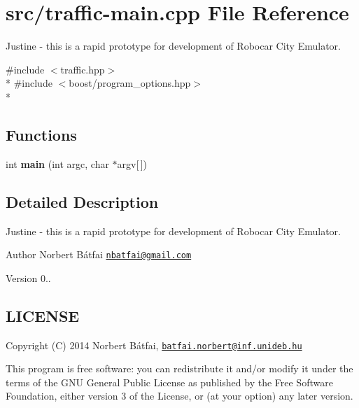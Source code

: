 \hypertarget{traffic-main_8cpp}{\section{src/traffic-\/main.cpp File Reference}
\label{traffic-main_8cpp}
}


Justine -\/ this is a rapid prototype for development of Robocar City Emulator.  


{\ttfamily \#include $<$traffic.\-hpp$>$}\\*
{\ttfamily \#include $<$boost/program\-\_\-options.\-hpp$>$}\\*
\subsection*{Functions}
\begin{DoxyCompactItemize}
\item 
\hypertarget{traffic-main_8cpp_a0ddf1224851353fc92bfbff6f499fa97}{int {\bfseries main} (int argc, char $\ast$argv\mbox{[}$\,$\mbox{]})}\label{traffic-main_8cpp_a0ddf1224851353fc92bfbff6f499fa97}

\end{DoxyCompactItemize}


\subsection{Detailed Description}
Justine -\/ this is a rapid prototype for development of Robocar City Emulator. \begin{DoxyAuthor}{Author}
Norbert Bátfai \href{mailto:nbatfai@gmail.com}{\tt nbatfai@gmail.\-com} 
\end{DoxyAuthor}
\begin{DoxyVersion}{Version}
0..
\end{DoxyVersion}
\hypertarget{traffic_8cpp_LICENSE}{}\subsection{L\-I\-C\-E\-N\-S\-E}\label{traffic_8cpp_LICENSE}
Copyright (C) 2014 Norbert Bátfai, \href{mailto:batfai.norbert@inf.unideb.hu}{\tt batfai.\-norbert@inf.\-unideb.\-hu}

This program is free software\-: you can redistribute it and/or modify it under the terms of the G\-N\-U General Public License as published by the Free Software Foundation, either version 3 of the License, or (at your option) any later version.

